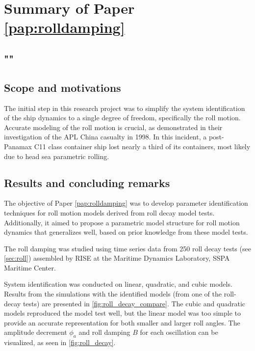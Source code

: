 \section{Summary of Paper \ref{pap:rolldamping}}
\subsection*{""}
\subsection*{Scope and motivations}
The initial step in this research project was to simplify the system identification of the ship dynamics to a single degree of freedom, specifically the roll motion. Accurate modeling of the roll motion is crucial, as \textcite{franceInvestigationHeadSeaParametric2001} demonstrated in their investigation of the APL China casualty in 1998. In this incident, a post-Panamax C11 class container ship lost nearly a third of its containers, most likely due to head sea parametric rolling.

\subsection*{Results and concluding remarks}
The objective of Paper \ref{pap:rolldamping} was to develop parameter identification techniques for roll motion models derived from roll decay model tests. Additionally, it aimed to propose a parametric model structure for roll motion dynamics that generalizes well, based on prior knowledge from these model tests.

The roll damping was studied using time series data from 250 roll decay tests (see \autoref{sec:roll}) assembled by RISE at the Maritime Dynamics Laboratory, SSPA Maritime Center.

System identification was conducted on linear, quadratic, and cubic models. Results from the simulations with the identified models (from one of the roll-decay tests) are presented in \autoref{fig:roll_decay_compare}. The cubic and quadratic models reproduced the model test well, but the linear model was too simple to provide an accurate representation for both smaller and larger roll angles. The amplitude decrement $\phi_a$ and roll damping $B$ for each oscillation can be visualized, as seen in \autoref{fig:roll_decay}.


